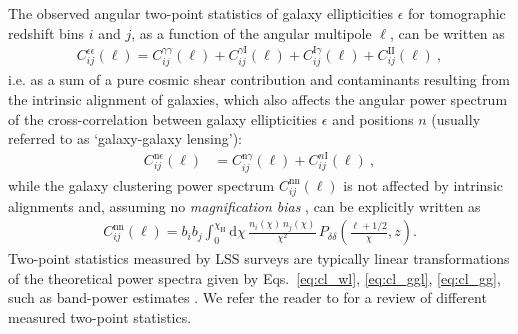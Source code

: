 \documentclass[fleqn,usenatbib]{mnras}
\begin{document}
The observed angular two-point statistics of galaxy ellipticities $\epsilon$ for tomographic redshift bins $i$ and $j$, as a function of the angular multipole $\ell$, can be written as
\begin{align}\label{eq:cl_wl}
    C^{\epsilon \epsilon}_{ij}(\ell) = C^{\gamma \gamma}_{ij}(\ell) + C^{\gamma \mathrm{I}}_{ij}(\ell) + C^{\mathrm{I}\gamma}_{ij}(\ell) + C^{\mathrm{II}}_{ij}(\ell) \ ,
\end{align}
i.e. as a sum of a pure cosmic shear contribution and contaminants resulting from the intrinsic alignment of galaxies, which also affects the angular power spectrum of the cross-correlation between galaxy ellipticities $\epsilon$ and positions $n$ (usually referred to as `galaxy-galaxy lensing'):
\begin{align}\label{eq:cl_ggl}
    C^{\mathrm{n} \epsilon}_{ij}(\ell) &= C^{\mathrm{n} \gamma}_{ij}(\ell) + C^{n \mathrm{I}}_{ij}(\ell) \ ,
\end{align}
while the galaxy clustering power spectrum $C^{\mathrm{n n}}_{ij}(\ell)$ is not affected by intrinsic alignments and, assuming no \textit{magnification bias} \citep{Duncan13, von_Wietersheim_Kramsta21}, can be explicitly written as 
\begin{align}\label{eq:cl_gg}
    C^{\mathrm{n n}}_{ij}(\ell) = b_i b_j \int_0^{\chi_\mathrm{H}} \mathrm{d} \chi \, \frac{n_{i}(\chi) \, n_{j}(\chi)}{\chi^2} \,  P_{\delta \delta} \left( \frac{\ell+1/2}{\chi}, z \right). 
\end{align}
Two-point statistics measured by LSS surveys are typically linear transformations of the theoretical power spectra given by Eqs.~\ref{eq:cl_wl}, \ref{eq:cl_ggl}, \ref{eq:cl_gg}, such as band-power estimates \citep{Schneider02, vanUitert18}. We refer the reader to \citet{Asgari20} for a review of different measured two-point statistics.
\end{document}
